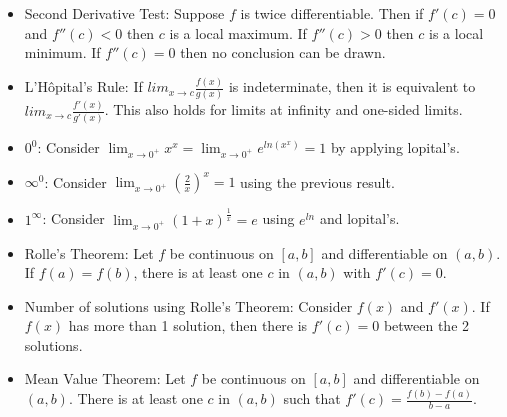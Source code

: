 \documentclass[10pt, portrait]{article}
\begin{document}
\begin{multicols*}{2}
\begin{itemize}
    \item Second Derivative Test: Suppose $f$ is twice differentiable. Then if $f'(c)=0$ and $f{''}(c)<0$ then $c$ is a local maximum. If $f{''}(c)>0$ then $c$ is a local minimum. If $f''(c)=0$ then no conclusion can be drawn.
    \item L'Hôpital's Rule: If $lim_{x\to c}\frac{f(x)}{g(x)}$ is indeterminate, then it is equivalent to $lim_{x\to c}\frac{f'(x)}{g'(x)}$. This also holds for limits at infinity and one-sided limits.
    \item $0^0$: Consider $\lim_{x\to 0^+}x^x = \lim_{x\to 0^+}e^{ln(x^x)}=1$ by applying lopital's.
    \item $\infty^0$: Consider $\lim_{x\to 0^+}(\frac{2}{x})^x = 1$ using the previous result.
    \item $1^\infty$: Consider $\lim_{x\to 0^+}(1+x)^{\frac{1}{x}}=e$ using $e^{ln}$ and lopital's.
    \item Rolle's Theorem: Let $f$ be continuous on $[a,b]$ and differentiable on $(a,b)$. If $f(a)=f(b)$, there is at least one $c$ in $(a,b)$ with $f'(c)=0$.
    \item Number of solutions using Rolle's Theorem: Consider $f(x)$ and $f'(x)$. If $f(x)$ has more than 1 solution, then there is $f'(c)=0$ between the 2 solutions.
    \item Mean Value Theorem: Let $f$ be continuous on $[a,b]$ and differentiable on $(a,b)$. There is at least one $c$ in $(a,b)$ such that $f'(c)=\frac{f(b)-f(a)}{b-a}$.
\end{itemize}


\end{multicols*}
\end{document}
